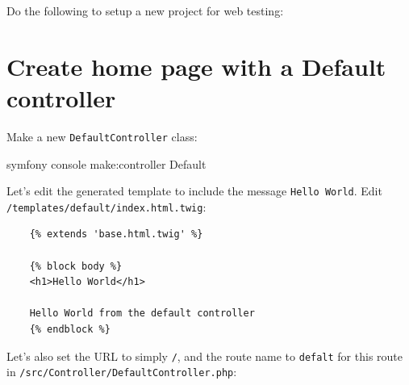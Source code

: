 \documentclass[a4paperpaper,openright]{book}
\newenvironment{Shaded}{}{}
\newcommand{\BuiltInTok}[1]{#1}
\newcommand{\CommentTok}[1]{\textcolor[rgb]{0.38,0.63,0.69}{\textit{#1}}}
\newcommand{\ExtensionTok}[1]{#1}
\newcommand{\KeywordTok}[1]{\textcolor[rgb]{0.00,0.44,0.13}{\textbf{#1}}}
\newcommand{\NormalTok}[1]{#1}
\newcommand{\OtherTok}[1]{\textcolor[rgb]{0.00,0.44,0.13}{#1}}
\newcommand{\StringTok}[1]{\textcolor[rgb]{0.25,0.44,0.63}{#1}}
\begin{document}
Do the following to setup a new project for web testing:

\begin{Shaded}
\end{Shaded}

\hypertarget{create-home-page-with-a-default-controller}{%
\section{Create home page with a Default
controller}\label{create-home-page-with-a-default-controller}}

Make a new \texttt{DefaultController} class:

\begin{Shaded}
\begin{Highlighting}[]
    \ExtensionTok{symfony}\NormalTok{ console make:controller Default}
\end{Highlighting}
\end{Shaded}

Let's edit the generated template to include the message
\texttt{Hello\ World}. Edit \texttt{/templates/default/index.html.twig}:

\begin{verbatim}
    {% extends 'base.html.twig' %}

    {% block body %}
    <h1>Hello World</h1>

    Hello World from the default controller
    {% endblock %}
\end{verbatim}

Let's also set the URL to simply \texttt{/}, and the route name to
\texttt{defalt} for this route in
\texttt{/src/Controller/DefaultController.php}:

\begin{Shaded}
\end{Shaded}
\end{document}
